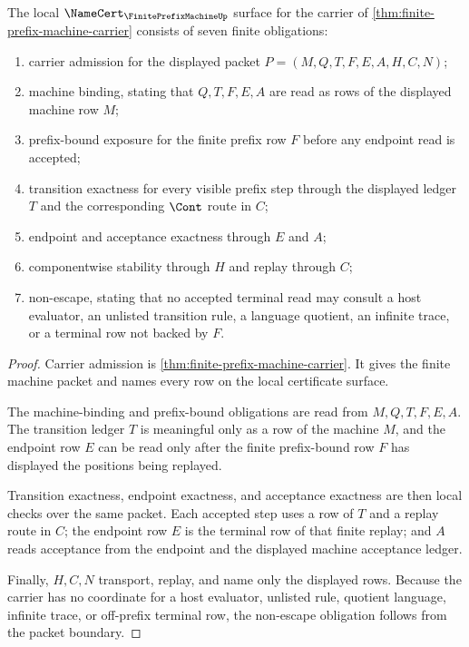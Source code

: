 \begin{theorem}
\label{thm:finite-prefix-machine-namecert-obligations}
The local $\NameCert_{\FinitePrefixMachineUp}$ surface for the carrier of \autoref{thm:finite-prefix-machine-carrier} consists of seven finite obligations:
\begin{enumerate}
\item carrier admission for the displayed packet $P=(M,Q,T,F,E,A,H,C,N)$;
\item machine binding, stating that $Q,T,F,E,A$ are read as rows of the displayed machine row $M$;
\item prefix-bound exposure for the finite prefix row $F$ before any endpoint read is accepted;
\item transition exactness for every visible prefix step through the displayed ledger $T$ and the corresponding $\Cont$ route in $C$;
\item endpoint and acceptance exactness through $E$ and $A$;
\item componentwise stability through $H$ and replay through $C$;
\item non-escape, stating that no accepted terminal read may consult a host evaluator, an unlisted transition rule, a language quotient, an infinite trace, or a terminal row not backed by $F$.
\end{enumerate}
\end{theorem}
\begin{proof}
Carrier admission is \autoref{thm:finite-prefix-machine-carrier}. It gives the finite machine packet and names every row on the local certificate surface.

The machine-binding and prefix-bound obligations are read from $M,Q,T,F,E,A$. The transition ledger $T$ is meaningful only as a row of the machine $M$, and the endpoint row $E$ can be read only after the finite prefix-bound row $F$ has displayed the positions being replayed.

Transition exactness, endpoint exactness, and acceptance exactness are then local checks over the same packet. Each accepted step uses a row of $T$ and a replay route in $C$; the endpoint row $E$ is the terminal row of that finite replay; and $A$ reads acceptance from the endpoint and the displayed machine acceptance ledger.

Finally, $H,C,N$ transport, replay, and name only the displayed rows. Because the carrier has no coordinate for a host evaluator, unlisted rule, quotient language, infinite trace, or off-prefix terminal row, the non-escape obligation follows from the packet boundary.
\end{proof}

